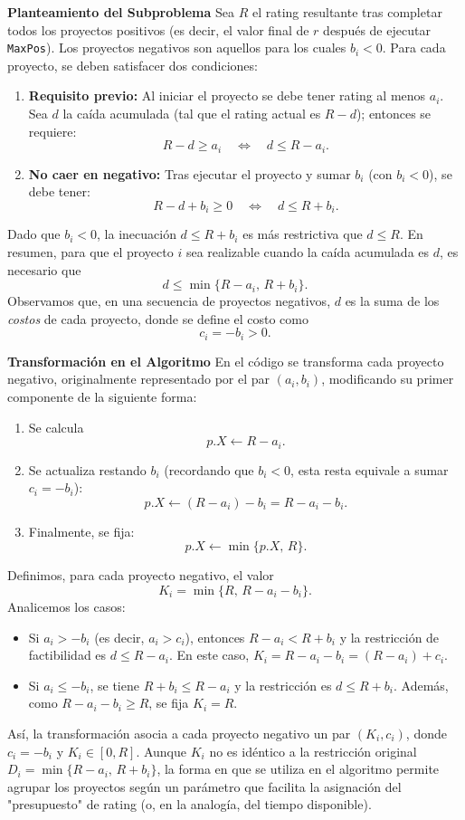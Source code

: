 ﻿\documentclass{article}
\theoremstyle{plain}
\theoremstyle{definition}
\begin{document}
\textbf{Planteamiento del Subproblema}
Sea $R$ el rating resultante tras completar todos los proyectos positivos (es decir, el valor final de $r$ después de ejecutar \texttt{MaxPos}). Los proyectos negativos son aquellos para los cuales $b_i < 0$. Para cada proyecto, se deben satisfacer dos condiciones:
\begin{enumerate}[label=\arabic*.]
    \item \textbf{Requisito previo:} Al iniciar el proyecto se debe tener rating al menos $a_i$. Sea $d$ la caída acumulada (tal que el rating actual es $R-d$); entonces se requiere:
    \[
    R-d \ge a_i \quad \Longleftrightarrow \quad d \le R-a_i.
    \]
    \item \textbf{No caer en negativo:} Tras ejecutar el proyecto y sumar $b_i$ (con $b_i < 0$), se debe tener:
    \[
    R-d+b_i \ge 0 \quad \Longleftrightarrow \quad d \le R+b_i.
    \]
\end{enumerate}
Dado que $b_i < 0$, la inecuación $d \le R+b_i$ es más restrictiva que $d \le R$. En resumen, para que el proyecto $i$ sea realizable cuando la caída acumulada es $d$, es necesario que
\[
d \le \min\{R-a_i,\, R+b_i\}.
\]
Observamos que, en una secuencia de proyectos negativos, $d$ es la suma de los \emph{costos} de cada proyecto, donde se define el costo como
\[
c_i = -b_i > 0.
\]

\textbf{Transformación en el Algoritmo}
En el código se transforma cada proyecto negativo, originalmente representado por el par $(a_i, b_i)$, modificando su primer componente de la siguiente forma:
\begin{enumerate}[label=\alph*)]
    \item Se calcula
    \[
    p.X \leftarrow R - a_i.
    \]
    \item Se actualiza restando $b_i$ (recordando que $b_i < 0$, esta resta equivale a sumar $c_i = -b_i$):
    \[
    p.X \leftarrow (R - a_i) - b_i = R - a_i - b_i.
    \]
    \item Finalmente, se fija:
    \[
    p.X \leftarrow \min\{p.X,\, R\}.
    \]
\end{enumerate}
Definimos, para cada proyecto negativo, el valor
\[
K_i = \min\{R,\, R-a_i-b_i\}.
\]
Analicemos los casos:
\begin{itemize}
    \item Si $a_i > -b_i$ (es decir, $a_i > c_i$), entonces $R-a_i < R+b_i$ y la restricción de factibilidad es $d\le R-a_i$. En este caso, $K_i = R-a_i-b_i = (R-a_i)+c_i$.
    \item Si $a_i \le -b_i$, se tiene $R+b_i \le R-a_i$ y la restricción es $d\le R+b_i$. Además, como $R-a_i-b_i \ge R$, se fija $K_i = R$.
\end{itemize}
Así, la transformación asocia a cada proyecto negativo un par $(K_i, c_i)$, donde $c_i = -b_i$ y $K_i \in [0, R]$. Aunque $K_i$ no es idéntico a la restricción original $D_i = \min\{R-a_i,\, R+b_i\}$, la forma en que se utiliza en el algoritmo permite agrupar los proyectos según un parámetro que facilita la asignación del "presupuesto" de rating (o, en la analogía, del tiempo disponible).
\\
\end{document}
